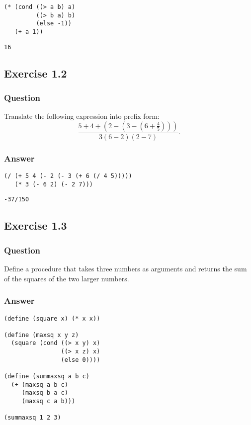 \documentclass[11pt]{article}
\begin{document}
\begin{verbatim}
(* (cond ((> a b) a)
         ((> b a) b)
         (else -1))
   (+ a 1))
\end{verbatim}

\begin{verbatim}
16
\end{verbatim}

\subsection{Exercise 1.2}
\label{sec:orgde43b95}
\subsubsection{Question}
\label{sec:org859b0ce}
Translate the following expression into prefix
form:
$$
\frac{5 + 4 + (2 - (3 - (6 + \frac{4}{5})))}
{3(6 - 2) (2 - 7)}.
$$

\subsubsection{Answer}
\label{sec:orgaef6194}
\begin{verbatim}
(/ (+ 5 4 (- 2 (- 3 (+ 6 (/ 4 5)))))
   (* 3 (- 6 2) (- 2 7)))
\end{verbatim}

\begin{verbatim}
-37/150
\end{verbatim}

\subsection{Exercise 1.3}
\label{sec:org59cf48f}
\subsubsection{Question}
\label{sec:org89fa0ad}
Define a procedure that takes three numbers
as arguments and returns the sum of the squares of the two
larger numbers.

\subsubsection{Answer}
\label{sec:org8029dcb}
\begin{verbatim}
(define (square x) (* x x))

(define (maxsq x y z)
  (square (cond ((> x y) x)
                ((> x z) x)
                (else 0))))

(define (summaxsq a b c)
  (+ (maxsq a b c)
     (maxsq b a c)
     (maxsq c a b)))

(summaxsq 1 2 3)
\end{verbatim}
\end{document}
